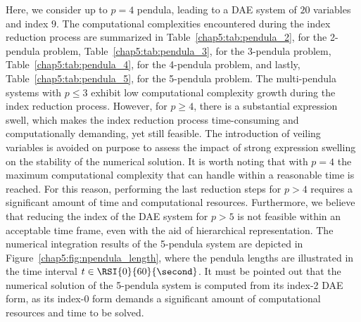 Here, we consider up to $p = 4$ pendula, leading to a \ac{DAE} system of $20$ variables and index $9$. The computational complexities encountered during the index reduction process are summarized in Table~\ref{chap5:tab:pendula_2}, for the 2-pendula problem, Table~\ref{chap5:tab:pendula_3}, for the 3-pendula problem, Table~\ref{chap5:tab:pendula_4}, for the 4-pendula problem, and lastly, Table~\ref{chap5:tab:pendula_5}, for the 5-pendula problem. The multi-pendula systems with $p \leq 3$ exhibit low computational complexity growth during the index reduction process. However, for $p \geq 4$, there is a substantial expression swell, which makes the index reduction process time-consuming and computationally demanding, yet still feasible. The introduction of veiling variables is avoided on purpose to assess the impact of strong expression swelling on the stability of the numerical solution.
It is worth noting that with $p = 4$ the maximum computational complexity that \Maple{} can handle within a reasonable time is reached. For this reason, performing the last reduction steps for $p > 4$ requires a significant amount of time and computational resources. Furthermore, we believe that reducing the index of the \ac{DAE} system for $p > 5$ is not feasible within an acceptable time frame, even with the aid of hierarchical representation. The numerical integration results of the 5-pendula system are depicted in Figure~\ref{chap5:fig:npendula_length}, where the pendula lengths are illustrated in the time interval $t \in \RSI{0}{60}{\second}$. It must be pointed out that the numerical solution of the 5-pendula system is computed from its index-2 \ac{DAE} form, as its index-0 form demands a significant amount of computational resources and time to be solved.

